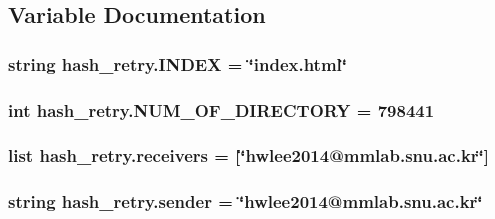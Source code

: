 \subsection{Variable Documentation}
\hypertarget{namespacehash__retry_a4c05f3670fe1899729908dd4372bcec1}{
\subsubsection[{I\-N\-D\-E\-X}]{\setlength{\rightskip}{0pt plus 5cm}string hash\-\_\-retry.\-I\-N\-D\-E\-X = \char`\"{}index.\-html\char`\"{}}}\label{namespacehash__retry_a4c05f3670fe1899729908dd4372bcec1}
\hypertarget{namespacehash__retry_a943f2c8d6c8c601de55f75797eedc26a}{
\subsubsection[{N\-U\-M\-\_\-\-O\-F\-\_\-\-D\-I\-R\-E\-C\-T\-O\-R\-Y}]{\setlength{\rightskip}{0pt plus 5cm}int hash\-\_\-retry.\-N\-U\-M\-\_\-\-O\-F\-\_\-\-D\-I\-R\-E\-C\-T\-O\-R\-Y = 798441}}\label{namespacehash__retry_a943f2c8d6c8c601de55f75797eedc26a}
\hypertarget{namespacehash__retry_ab14a6482688f9131dbbe96e823c38962}{
\subsubsection[{receivers}]{\setlength{\rightskip}{0pt plus 5cm}list hash\-\_\-retry.\-receivers = \mbox{[}\char`\"{}hwlee2014@mmlab.\-snu.\-ac.\-kr\char`\"{}\mbox{]}}}\label{namespacehash__retry_ab14a6482688f9131dbbe96e823c38962}
\hypertarget{namespacehash__retry_af5f6d05310b66f02f22e47cd7233c3cd}{
\subsubsection[{sender}]{\setlength{\rightskip}{0pt plus 5cm}string hash\-\_\-retry.\-sender = \char`\"{}hwlee2014@mmlab.\-snu.\-ac.\-kr\char`\"{}}}\label{namespacehash__retry_af5f6d05310b66f02f22e47cd7233c3cd}
